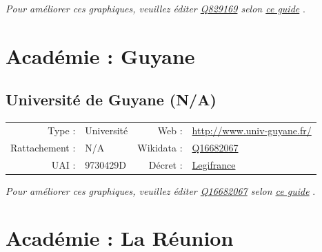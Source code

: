 \documentclass[12pt,french,landscape]{article}
\begin{document}
\textit{\scriptsize Pour améliorer ces graphiques, veuillez éditer \href{https://www.wikidata.org/entity/Q829169}{Q829169}  selon \href{https://github.com/cpesr/wikidataESR/blob/master/Rmd/wikidataESR.md}{ce guide}}
.


\newpage

\hypertarget{acaduxe9mie-guyane}{%
\section{Académie : Guyane}\label{acaduxe9mie-guyane}}

\hypertarget{universituxe9-de-guyane-na}{%
\subsection{Université de Guyane
(N/A)}\label{universituxe9-de-guyane-na}}

\begin{tabular*}{0.45\textwidth}{rp{2cm}rl}  
\hline  
Type : & Université & Web : &\href{http://www.univ-guyane.fr/}{http://www.univ-guyane.fr/} \\  
Rattachement : & N/A & Wikidata : & \href{https://www.wikidata.org/entity/Q16682067}{Q16682067} \\  
UAI : & 9730429D & Décret : & \href{http://www.legifrance.gouv.fr/affichTexte.do;jsessionid=?cidTexte=JORFTEXT000029310823&dateTexte=&oldAction=dernierJO&categorieLien=id}{Legifrance} \\  
\hline  
\end{tabular*}

\textit{\scriptsize Pour améliorer ces graphiques, veuillez éditer \href{https://www.wikidata.org/entity/Q16682067}{Q16682067}  selon \href{https://github.com/cpesr/wikidataESR/blob/master/Rmd/wikidataESR.md}{ce guide}}
.


\newpage

\hypertarget{acaduxe9mie-la-ruxe9union}{%
\section{Académie : La Réunion}\label{acaduxe9mie-la-ruxe9union}}
\end{document}
